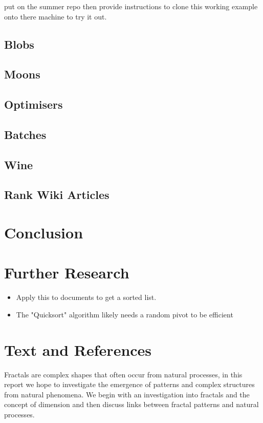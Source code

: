 \documentclass[a4paper,11pt,twoside]{article}
\begin{document}
put on the summer repo then provide instructions to clone this
working example onto there machine to try it out.
\subsection{Blobs}
\label{sec:org269d1ea}
\subsection{Moons}
\label{sec:org1cc3468}
\subsection{Optimisers}
\label{sec:org8f438d6}
\subsection{Batches}
\label{sec:org240e276}
\subsection{Wine}
\label{sec:org33a8095}
\subsection{Rank Wiki Articles}
\label{sec:org623e6f0}

\section{Conclusion}
\label{sec:org29380fe}

\section{Further Research}
\label{sec:org0b72301}

\begin{itemize}
\item Apply this to documents to get a sorted list.
\item The "Quicksort" algorithm likely needs a random pivot to be efficient \cite{timroughgardenQuicksortOverview2017}
\end{itemize}

\section{Text and References}
\label{sec:orgc1b68d3}
Fractals are complex shapes that often occur from natural processes, in this
report we hope to investigate the emergence of patterns and complex structures
from natural phenomena. We begin with an investigation into fractals and the
concept of dimension and then discuss links between fractal patterns and natural
processes.
\end{document}

